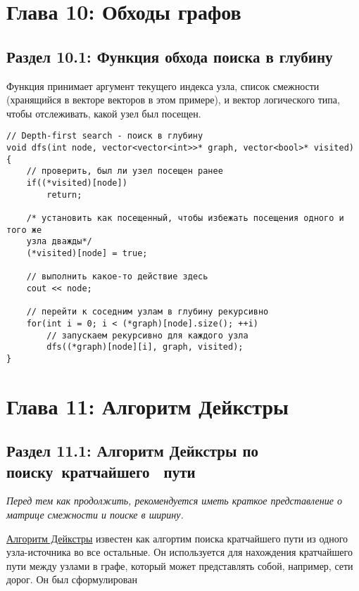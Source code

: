 
\chapter*{Глава 10: Обходы графов}
\section*{Раздел 10.1: Функция обхода поиска в глубину}

\vspace{\baselineskip}
Функция принимает аргумент текущего индекса узла, список смежности (хранящийся в векторе векторов в этом примере), и вектор логического типа, чтобы отслеживать, какой узел был посещен.

\vspace{\baselineskip}
\begin{tcolorbox}
\begin{verbatim}
// Depth-first search - поиск в глубину
void dfs(int node, vector<vector<int>>* graph, vector<bool>* visited) {
	// проверить, был ли узел посещен ранее
	if((*visited)[node])
		return;

	/* установить как посещенный, чтобы избежать посещения одного и того же 
	узла дважды*/ 
	(*visited)[node] = true;

	// выполнить какое-то действие здесь
	cout << node;

	// перейти к соседним узлам в глубину рекурсивно
	for(int i = 0; i < (*graph)[node].size(); ++i)
		// запускаем рекурсивно для каждого узла
		dfs((*graph)[node][i], graph, visited);
}
\end{verbatim}
\end{tcolorbox}

\chapter*{Глава 11: Алгоритм Дейкстры}

\section*{Раздел 11.1: Алгоритм Дейкстры по поиску~кратчайшего \ пути}

\vspace{\baselineskip}
\textit{Перед тем как продолжить, рекомендуется иметь краткое представление о матрице смежности и поиске в ширину.}

\vspace{\baselineskip}
\href{https://en.wikipedia.org/wiki/Dijkstra\%27s_algorithm}{\underline{Алгоритм Дейкстры}} известен как алгортим поиска кратчайшего пути из одного узла-источника во все остальные. Он используется для нахождения кратчайшего пути между узлами в графе, который может представлять собой, например, сети дорог. Он был сформулирован

